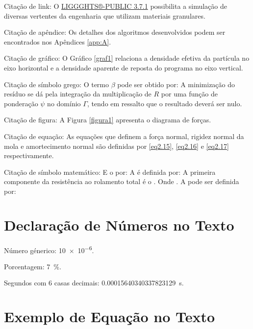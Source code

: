 		Citação de link:
			O \href{https://github.com/CFDEMproject/LIGGGHTS-PUBLIC}{LIGGGHTS®-PUBLIC 3.7.1} possibilita a simulação de diversas vertentes da engenharia que utilizam materiais granulares.
			
		Citação de apêndice:
			Os detalhes dos algoritmos desenvolvidos podem ser encontrados nos Apêndices \ref{app:A}.
			
		Citação de gráfico:
			O Gráfico \ref{graf1} relaciona a densidade efetiva da partícula no eixo horizontal e a densidade aparente de reposta do programa no eixo vertical.
			
		Citação de símbolo grego:
			O termo $ \beta $ pode ser obtido por:
			A minimização do resíduo se dá pela integração da multiplicação de $ R $ por uma função de ponderação $ \psi $ no domínio $ \Gamma $, tendo em ressalto que o resultado deverá ser nulo.
			
		Citação de figura:
			A Figura \ref{figura1} apresenta o diagrama de forças.
			
		Citação de equação:
			As equações que definem a força normal, rigidez normal da mola e amortecimento normal são definidas por \ref{eq2.15}, \ref{eq2.16} e \ref{eq2.17} respectivamente.
			
		Citação de símbolo matemático:
			E o  por:
			A  é definida por:
			A primeira componente da resistência ao rolamento total é o .
			Onde .
			A  pode ser definida por:

	\section{\esp Declaração de Números no Texto}\label{section:2.1}

		Número génerico: \num{10e-6}.
		
		Porcentagem: \SI{7}{\%}.
		
		Segundos com 6 casas decimais: \SI[{round-precision=6}]{0.00015640340337823129}{\second}.
    
	\section{\esp Exemplo de Equação no Texto}\label{section:2.1}
			

